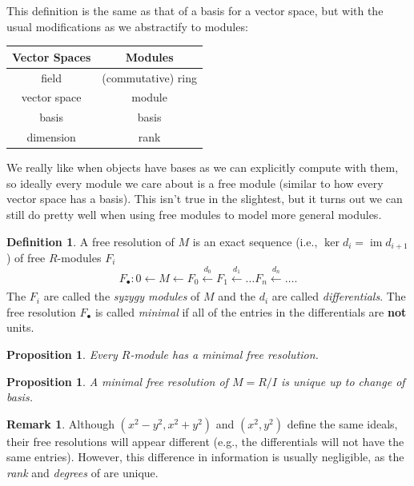 \documentclass[12pt,a4paper]{article}
\DeclareMathOperator{\image}{im}
\newtheorem{proposition}[theorem]{Proposition}
\theoremstyle{definition}
\newtheorem{definition}[theorem]{Definition}
\newtheorem{remark}[theorem]{Remark}
\numberwithin{equation}{section}
\begin{document}
This definition is the same as that of a basis for a vector space, but with the usual modifications as we abstractify to modules:
\begin{center}
{\renewcommand{\arraystretch}{2.5}
\begin{tabular}{|c||c|}
    \hline
    {\bf Vector Spaces} & {\bf Modules} \\
    \hline
    \hline
    field & (commutative) ring \\
    \hline
    vector space & module \\
    \hline
    basis & basis \\
    \hline
    dimension & rank \\
    \hline
\end{tabular}}
\end{center}

We really like when objects have bases as we can explicitly compute with them, so ideally every module we care about is a free module (similar to how every vector space has a basis).
This isn't true in the slightest, but it turns out we can still do pretty well when using free modules to model more general modules.

\begin{definition}
    A free resolution of $M$ is an exact sequence (i.e., $\ker{d_i} = \image{d_{i+1}}$) of free $R$-modules $F_i$
    \begin{equation*}
    F_\bullet \colon 0 \leftarrow M \leftarrow F_0 \xleftarrow[]{d_0} F_1 \xleftarrow{d_1} \dots F_n \xleftarrow[]{d_n} \dots.
    \end{equation*}
    The $F_i$ are called the \emph{syzygy modules} of $M$ and the $d_i$ are called \emph{differentials}.
    The free resolution $F_\bullet$ is called \emph{minimal} if all of the entries in the differentials are \textbf{not} units.
\end{definition}

\begin{proposition}
    Every $R$-module has a minimal free resolution.
\end{proposition}

\begin{proposition}
    A minimal free resolution of $M = R/I$ is unique up to change of basis.
\end{proposition}

\begin{remark}
    Although $(x^2 - y^2, x^2 + y^2)$ and $(x^2, y^2)$ define the same ideals, their free resolutions will appear different (e.g., the differentials will not have the same entries).
    However, this difference in information is usually negligible, as the \emph{rank} and \emph{degrees} of are unique.
\end{remark}
\end{document}
